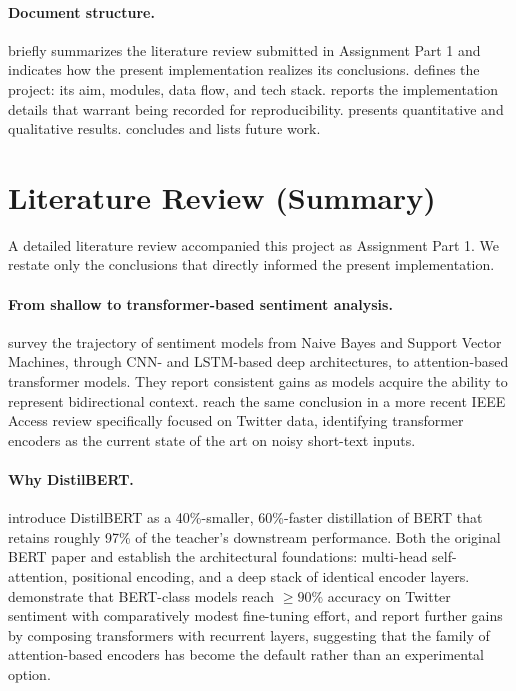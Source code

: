 \documentclass[11pt, a4paper]{article}
\begin{document}
\paragraph{Document structure.}
 briefly summarizes the literature review submitted in Assignment Part 1 and indicates how the present implementation realizes its conclusions.  defines the project: its aim, modules, data flow, and tech stack.  reports the implementation details that warrant being recorded for reproducibility.  presents quantitative and qualitative results.  concludes and lists future work.

\section{Literature Review (Summary)}\label{sec:litreview}

A detailed literature review accompanied this project as Assignment Part 1. We restate only the conclusions that directly informed the present implementation.

\paragraph{From shallow to transformer-based sentiment analysis.}
\citet{yadav2020sentiment} survey the trajectory of sentiment models from Naive Bayes and Support Vector Machines, through CNN- and LSTM-based deep architectures, to attention-based transformer models. They report consistent gains as models acquire the ability to represent bidirectional context. \citet{albladi2025sentiment} reach the same conclusion in a more recent IEEE Access review specifically focused on Twitter data, identifying transformer encoders as the current state of the art on noisy short-text inputs.

\paragraph{Why DistilBERT.}
\citet{sanh2019distilbert} introduce DistilBERT as a 40\%-smaller, 60\%-faster distillation of BERT \citep{devlin2019bert} that retains roughly 97\% of the teacher's downstream performance. Both the original BERT paper \citep{devlin2019bert} and \citet{vaswani2017attention} establish the architectural foundations: multi-head self-attention, positional encoding, and a deep stack of identical encoder layers. \citet{chintalapudi2021sentiment} demonstrate that BERT-class models reach $\geq 90\%$ accuracy on Twitter sentiment with comparatively modest fine-tuning effort, and \citet{tan2022roberta} report further gains by composing transformers with recurrent layers, suggesting that the family of attention-based encoders has become the default rather than an experimental option.
\end{document}
